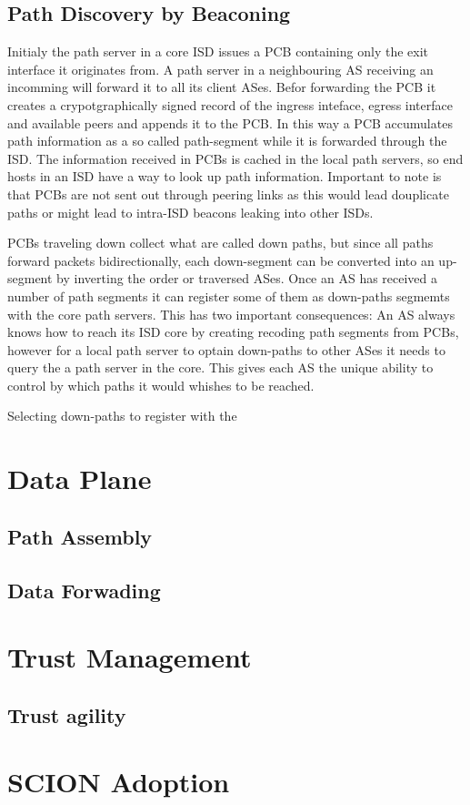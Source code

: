 \documentclass[../eva1_scion.tex]{subfiles}
\begin{document}
    \subsection{Path Discovery by Beaconing}\label{ssec:beaconing}
    Initialy the path server in a core ISD issues a PCB containing only the exit interface it originates from. A path server in a neighbouring AS receiving an incomming will forward it to all its client ASes. Befor forwarding the PCB it creates a crypotgraphically signed record of the ingress inteface, egress interface and available peers and appends it to the PCB. In this way a PCB accumulates path information as a so called path-segment while it is forwarded through the ISD. The information received in PCBs is cached in the local path servers, so end hosts in an ISD have a way to look up path information. Important to note is that PCBs are not sent out through peering links as this would lead douplicate paths or might lead to intra-ISD beacons leaking into other ISDs.

    PCBs traveling down collect what are called down paths, but since all paths forward packets bidirectionally, each down-segment can be converted into an up-segment by inverting the order or traversed ASes. Once an AS has received a number of path segments it can register some of them as down-paths segmemts with the core path servers. This has two important consequences:  An AS always knows how to reach its ISD core by creating recoding path segments from PCBs, however for a local path server to optain down-paths to other ASes it needs to query the a path server in the core. This gives each AS the unique ability to control by which paths it would whishes to be reached.

    Selecting down-paths to register with the




    \section{Data Plane}

    \subsection{Path Assembly} \label{ssec:path_assembly}
    \subsection{Data Forwading}
    
    \section{Trust Management}
    \subsection{Trust agility}
    \section{SCION Adoption}
\end{document}
